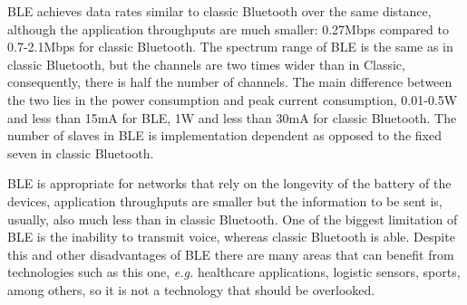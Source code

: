\gls{BLE} achieves data rates similar to classic Bluetooth over the same distance, although the application throughputs are much smaller: 0.27Mbps compared to 0.7-2.1Mbps for classic Bluetooth. The spectrum range of \gls{BLE} is the same as in classic Bluetooth, but the channels are two times wider than in Classic, consequently, there is half the number of channels. The main difference between the two lies in the power consumption and peak current consumption, 0.01-0.5W and less than 15mA for \gls{BLE}, 1W and less than 30mA for classic Bluetooth. The number of slaves in \gls{BLE} is implementation dependent as opposed to the fixed seven in classic Bluetooth.

\gls{BLE} is appropriate for networks that rely on the longevity of the battery of the devices, application throughputs are smaller but the information to be sent is, usually, also much less than in classic Bluetooth. One of the biggest limitation of \gls{BLE} is the inability to transmit voice, whereas classic Bluetooth is able. Despite this and other disadvantages of \gls{BLE} there are many areas that can benefit from technologies such as this one, \textit{e.g.} healthcare applications, logistic sensors, sports, among others, so it is not a technology that should be overlooked.











